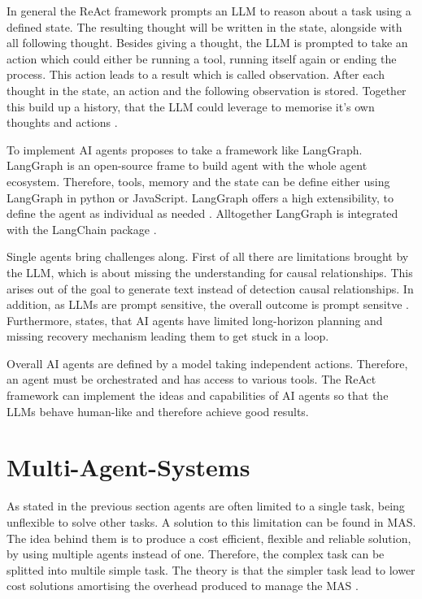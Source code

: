 \documentclass[a4paper,oneside,bibliography=totoc]{scrbook}
\begin{document}
In general the ReAct framework prompts an \ac{LLM} to reason about a task using a defined state. The resulting thought will be written in the state, alongside with all following thought. Besides giving a thought, the \ac{LLM} is prompted to take an action which could either be running a tool, running itself again or ending the process. This action leads to a result which is called observation. After each thought in the state, an action and the following observation is stored. Together this build up a history, that the \ac{LLM} could leverage to memorise it's own thoughts and actions \cite{Yao2023}.

To implement \ac{AI} agents \citet{Anthropic2024} proposes to take a framework like LangGraph. LangGraph is an open-source frame to build agent with the whole agent ecosystem. Therefore, tools, memory and the state can be define either using LangGraph in python or JavaScript. LangGraph offers a high extensibility, to define the agent as individual as needed \cite{LangChain2025}. Alltogether LangGraph is integrated with the LangChain package \cite{LangChain2025a}.

Single agents bring challenges along. First of all there are limitations brought by the \ac{LLM}, which is about missing the understanding for causal relationships. This arises out of the goal to generate text instead of detection causal relationships. In addition, as \acp{LLM} are prompt sensitive, the overall outcome is prompt sensitve \cite{Sapkota2025}. Furthermore, \citet{Sapkota2025} states, that \ac{AI} agents have limited long-horizon planning and missing recovery mechanism leading them to get stuck in a loop.

Overall \ac{AI} agents are defined by a model taking independent actions. Therefore, an agent must be orchestrated and has access to various tools. The ReAct framework can implement the ideas and capabilities of \ac{AI} agents so that the \acp{LLM} behave human-like and therefore achieve good results.

\section{Multi-Agent-Systems}
\label{sec:multi_agent_systems}

As stated in the previous section agents are often limited to a single task, being unflexible to solve other tasks. A solution to this limitation can be found in \ac{MAS}. The idea behind them is to produce a cost efficient, flexible and reliable solution, by using multiple agents instead of one. Therefore, the complex task can be splitted into multile simple task. The theory is that the simpler task lead to lower cost solutions amortising the overhead produced to manage the \ac{MAS} \cite{Dorri2018}.
\end{document}
